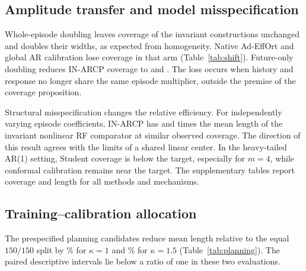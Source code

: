 \subsection{Amplitude transfer and model misspecification}
Whole-episode doubling leaves coverage of the invariant constructions unchanged and doubles their widths, as expected from homogeneity. Native Ad-EffOrt and global AR calibration lose coverage in that arm (Table~\ref{tab:shift}). Future-only doubling reduces IN-ARCP coverage to \FutureFour{} and \FutureTwelve{}. The loss occurs when history and response no longer share the same episode multiplier, outside the premise of the coverage proposition.

Structural misspecification changes the relative efficiency. For independently varying episode coefficients, IN-ARCP has \VariableFour{} and \VariableTwelve{} times the mean length of the invariant nonlinear RF comparator at similar observed coverage. The direction of this result agrees with the limits of a shared linear center. In the heavy-tailed AR(1) setting, Student coverage is below the target, especially for $m=4$, while conformal calibration remains near the target. The supplementary tables report coverage and length for all methods and mechanisms.

\begin{table}[t]
\centering\small
\caption{Gaussian scale-transfer and negative-control coverage. The whole-episode arm rescales the same evaluation episodes. The future-only arm changes standardized shape and is outside the coverage premise.}
\label{tab:shift}

\end{table}
\begin{table}[t]
\centering\small
\caption{Structural challenges with unchanged marginal-scale distribution. Ratios are IN-ARCP mean length divided by invariant RF mean length. Whole-episode doubling gives identical coverage and ratios for both invariant methods. The Student column exposes sensitivity of the Gaussian threshold.}
\label{tab:structural}

\end{table}

\subsection{Training--calibration allocation}
The prespecified planning candidates reduce mean length relative to the equal $150/150$ split by \PlanOneGain\%{} for $\kappa=1$ and \PlanMixGain\%{} for $\kappa=1.5$ (Table~\ref{tab:planning}). The paired descriptive intervals lie below a ratio of one in these two evaluations.

